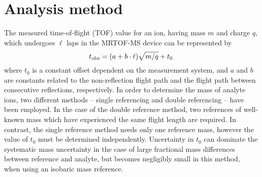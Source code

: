 \documentclass[3p]{elsarticle}
\begin{document}
\section{Analysis method}
\label{analysis}

The measured time-of-flight (TOF) value for an ion, having mass $m$ and charge $q$,  which undergoes $\ell$ laps in the MRTOF-MS device can be represented by 
\begin{equation}
t_{\rm obs} = (a + b \cdot \ell) \sqrt{m/q} + t_0
\label{eqObsTOF}
\end{equation}
where $t_0$ is a constant offset dependent on the measurement system, and $a$ and $b$ are constants related to the non-reflection flight path and the flight path between consecutive reflections, respectively. In order to determine the mass of analyte ions, two different methods -- single referencing \cite{Ito2013} and double referencing \cite{Wienholtz2013,Rosenbusch2015} -- have been employed. In the case of the double reference method, two references of well-known mass which have experienced the same flight length are required. In contrast, the single reference method needs only one reference mass, however the value of $t_0$ must be determined independently.  Uncertainty in $t_0$ can dominate the systematic mass uncertainty in the case of large fractional mass differences between reference and analyte, but becomes negligibly small in this method, when using an isobaric mass reference.  %
\end{document}
